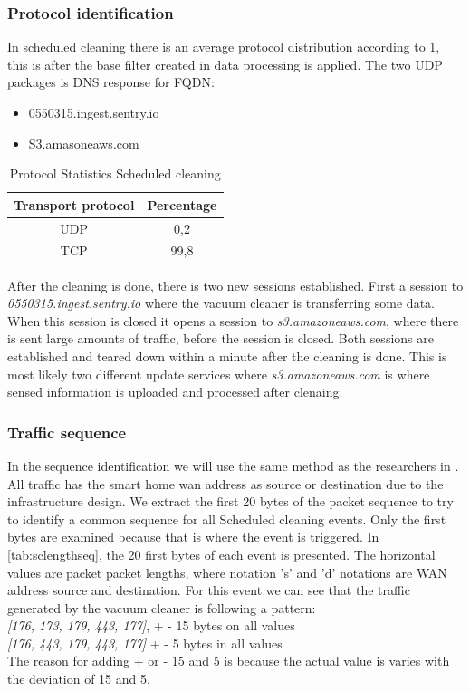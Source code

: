 \subsubsection{Protocol identification}
In scheduled cleaning there is an average protocol distribution according to \ref{tab:scanalysisdist}, this is after the base filter created in data processing is applied. The two UDP packages is DNS response for FQDN:

\begin{itemize}
    \item 0550315.ingest.sentry.io
    \item S3.amasoneaws.com
\end{itemize}

\begin{table}[H]
\centering
\caption{Protocol Statistics Scheduled cleaning}
\label{tab:scanalysisdist}
\begin{tabular}{|c|c|}
\hline
\textbf{Transport protocol} & \textbf{Percentage} \\ \hline
UDP                         & 0,2                 \\ \hline
TCP                         & 99,8                \\ \hline
\end{tabular}
\end{table}

After the cleaning is done, there is two new sessions established. First a session to \textit{0550315.ingest.sentry.io} where the vacuum cleaner is transferring some data. When this session is closed it opens a session to \textit{s3.amazoneaws.com}, where there is sent large amounts of traffic, before the session is closed. Both sessions are established and teared down within a minute after the cleaning is done. This is most likely two different update services where \textit{s3.amazoneaws.com} is where sensed information is uploaded and processed after clenaing.
 
\subsubsection{Traffic sequence}
In the sequence identification we will use the same method as the researchers in \cite{pingpong}. All traffic has the smart home wan address as source or destination due to the infrastructure design. We extract the first 20 bytes of the packet sequence to try to identify a common sequence for all Scheduled cleaning events. Only the first bytes are examined because that is where the event is triggered. In \ref{tab:sclengthseq}, the 20 first bytes of each event is presented. The horizontal values are packet packet lengths, where notation 's' and 'd' notations are WAN address source and destination.  
For this event we can see that the traffic generated by the vacuum cleaner is following a pattern: 
\\
\textit{[176, 173, 179, 443, 177]}, + - 15 bytes on all values 
\\
\textit{[176, 443, 179, 443, 177]} + - 5 bytes in all values
\\
The reason for adding + or - 15 and 5 is because the actual value is varies with the deviation of 15 and 5.

